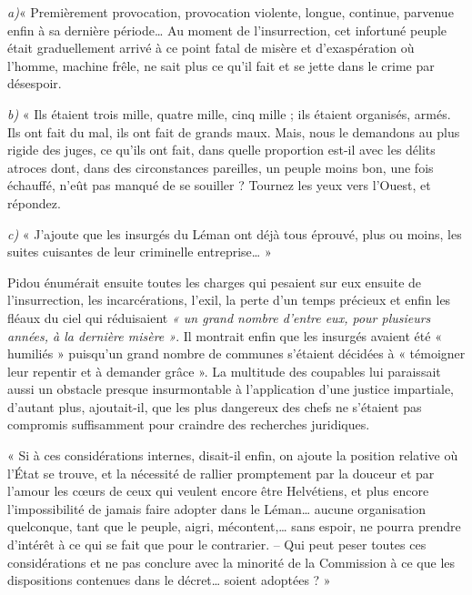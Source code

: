 \documentclass[french,twoside]{book} %
\newenvironment{quoteblock}%
  {\begin{quoting}}
  {\end{quoting}}
\newenvironment{quotebar}{%
    \def\FrameCommand{{\color{rubric!10!}\vrule width 0.5em} \hspace{0.9em}}%
    \def\OuterFrameSep{\itemsep} %
    \MakeFramed {\advance\hsize-\width \FrameRestore}
  }%
  {%
    \endMakeFramed
  }
\renewenvironment{quoteblock}%
  {%
    \savenotes
    \setstretch{0.9}
    \begin{quotebar}
  }
  {%
    \end{quotebar}
    \spewnotes
  }
\begin{document}
\begin{quoteblock}
 \noindent \emph{a)}« Premièrement provocation, provocation violente, longue, continue, parvenue enfin à sa dernière période… Au moment de l’insurrection, cet infortuné peuple était graduellement arrivé à ce point fatal de misère et d’exaspération où l’homme, machine frêle, ne sait plus ce qu’il fait et se jette dans le crime par désespoir.\par
 \emph{b)} « Ils étaient trois mille, quatre mille, cinq mille ; ils étaient organisés, armés. Ils ont fait du mal, ils ont fait de grands maux. Mais, nous le demandons au plus rigide des juges, ce qu’ils ont fait, dans quelle proportion est-il avec les délits atroces dont, dans des circonstances pareilles, un peuple moins bon, une fois échauffé, n’eût pas manqué de se souiller ? Tournez les yeux vers l’Ouest, et répondez.\par
 \emph{c)} « J’ajoute que les insurgés du Léman ont déjà tous éprouvé, plus ou moins, les suites cuisantes de leur criminelle entreprise… »
 \end{quoteblock}

\noindent Pidou énumérait ensuite toutes les charges qui pesaient sur eux ensuite de l’insurrection, les incarcérations, l’exil, la perte d’un temps précieux et enfin les fléaux du ciel qui réduisaient \emph{« un grand nombre d’entre eux, pour plusieurs années, à la dernière misère »}. Il montrait enfin que les insurgés avaient été « humiliés » puisqu’un grand nombre de communes s’étaient décidées à « témoigner leur repentir et à demander grâce ». La multitude des coupables lui paraissait aussi un obstacle presque insurmontable à l’application d’une justice impartiale, d’autant plus, ajoutait-il, que les plus dangereux des chefs ne s’étaient pas compromis suffisamment pour craindre des recherches juridiques.\par

\begin{quoteblock}
 \noindent « Si à ces considérations internes, disait-il enfin, on ajoute la position relative où l’État se trouve, et la nécessité de rallier promptement par la douceur et par l’amour les cœurs de ceux qui veulent encore être Helvétiens, et plus encore l’impossibilité de jamais faire adopter dans le Léman… aucune organisation quelconque, tant que le peuple, aigri, mécontent,… sans espoir, ne pourra prendre d’intérêt à ce qui se fait que pour le contrarier. – Qui peut peser toutes ces considérations et ne pas conclure avec la minorité de la Commission à ce que les dispositions contenues dans le décret… soient adoptées ? »
 \end{quoteblock}
\end{document}

